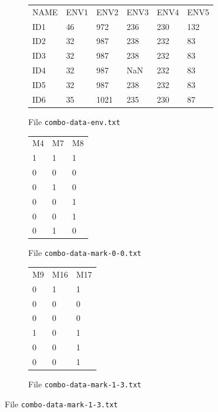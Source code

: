 \documentclass[a4paper,11pt]{article}
\begin{document}
\begin{figure}[htbp]
\begin{minipage}{1.2\textwidth}

\centering
\begin{subfigure}{\textwidth}
		\begin{mdframed}[backgroundcolor=white,userdefinedwidth=9.5cm,align=center]
		\begin{tabular}{*6{l}}
NAME & ENV1 & ENV2 & ENV3 & ENV4 & ENV5 \\ 
ID1 & 46 & 972 & 236 & 230 & 132 \\ 
ID2 & 32 & 987 & 238 & 232 & 83 \\ 
ID3 & 32 & 987 & 238 & 232 & 83 \\ 
ID4 & 32 & 987 & NaN & 232 & 83 \\ 
ID5 & 32 & 987 & 238 & 232 & 83 \\ 
ID6 & 35 & 1021 & 235 & 230 & 87 \\ 		\end{tabular}
	\end{mdframed}
	\parbox[l]{\textwidth}{\caption{File \texttt{combo-data-env.txt}\label{fig:combo-split-env}}}
	\end{subfigure}%
	
\vspace{2mm}	
	
	\begin{subfigure}[t]{.45\textwidth}
		\begin{mdframed}[backgroundcolor=white,userdefinedwidth=3.7cm,align=center]
		\begin{tabular}{lll}
M4 & M7 & M8 \\ 
1 & 1 & 1 \\ 
0 & 0 & 0 \\ 
0 & 1 & 0 \\ 
0 & 0 & 1 \\ 
0 & 0 & 1 \\ 
0 & 1 & 0 \\ 
		\end{tabular}
	\end{mdframed}
	\parbox[l]{\textwidth}{\caption{File \texttt{combo-data-mark-0-0.txt}\label{fig:combo-split-mol-0}}}
	\end{subfigure}%
	\begin{subfigure}[t]{.45\textwidth}
		\begin{mdframed}[backgroundcolor=white,userdefinedwidth=3.7cm,align=center]
		\begin{tabular}{lll}
M9 & M16 & M17 \\ 
0 & 1 & 1 \\ 
0 & 0 & 0 \\ 
0 & 0 & 0 \\ 
1 & 0 & 1 \\ 
0 & 0 & 1 \\ 
0 & 0 & 1 \\ 
		\end{tabular}
	\end{mdframed}
	\parbox[l]{\textwidth}{\caption{File \texttt{combo-data-mark-1-3.txt}\label{fig:combo-split-mol-1}}}
	\end{subfigure}	
	\hfill


\end{minipage}
\end{figure}
\end{document}
